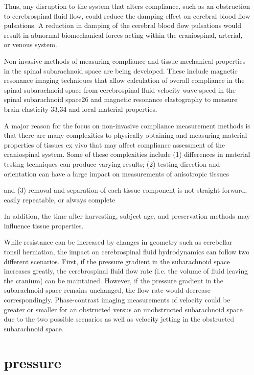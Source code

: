 \documentclass{report}
\begin{document}
Thus, any disruption to the system that alters
compliance, such as an obstruction to cerebrospinal
fluid flow, could reduce the damping effect on
cerebral blood flow pulsations. A reduction in
damping of the cerebral blood flow pulsations
would result in abnormal biomechanical forces
acting within the craniospinal, arterial, or venous
system.

Non-invasive
methods of measuring compliance and tissue
mechanical properties in the spinal subarachnoid
space are being developed. These include magnetic
resonance imaging techniques that allow calculation
of overall compliance in the spinal subarachnoid
space from cerebrospinal fluid velocity wave speed
in the spinal subarachnoid space26 and magnetic
resonance elastography to measure brain elasticity
33,34 and local material properties.

A major reason for the focus on non-invasive
compliance measurement methods is that there are
many complexities to physically obtaining and
measuring material properties of tissues ex vivo that
may affect compliance assessment of the craniospinal
system. Some of these complexities include (1)
differences in material testing techniques can produce
varying results; (2) testing direction and orientation
can have a large impact on measurements of
anisotropic tissues

and (3) removal and separation
of each tissue component is not straight forward,
easily repeatable, or always complete

In addition,
the time after harvesting, subject age, and preservation
methods may influence tissue properties.

While resistance can be increased by changes in
geometry such as cerebellar tonsil herniation, the
impact on cerebrospinal fluid hydrodynamics can
follow two different scenarios. First, if the pressure
gradient in the subarachnoid space increases greatly,
the cerebrospinal fluid flow rate (i.e. the volume of
fluid leaving the cranium) can be maintained.
However, if the pressure gradient in the subarachnoid
space remains unchanged, the flow rate would
decrease correspondingly. Phase-contrast imaging
measurements of velocity could be greater or smaller
for an obstructed versus an unobstructed subarachnoid
space due to the two possible scenarios as well
as velocity jetting in the obstructed subarachnoid
space.

\section{pressure}
\end{document}
